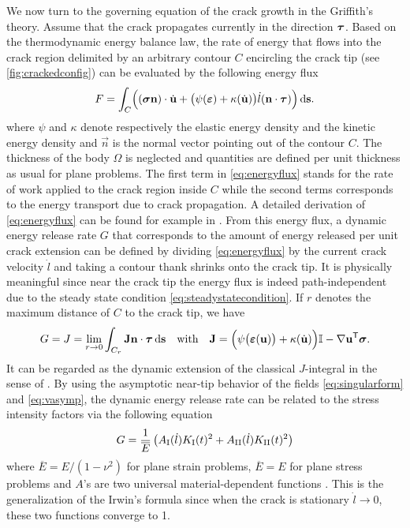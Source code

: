 We now turn to the governing equation of the crack growth in the Griffith's theory. Assume that the crack propagates currently in the direction $\vtau$. Based on the thermodynamic energy balance law, the rate of energy that flows into the crack region delimited by an arbitrary contour $C$ encircling the crack tip (see \cref{fig:crackedconfig}) can be evaluated by the following energy flux
\begin{equation} \label{eq:energyflux}
F=\int_C\Bigl((\sig\vec{n})\cdot\dot{\vec{u}}+\bigl(\psi(\eps)+\kappa(\dot{\vec{u}})\bigr)\dot{l}(\vec{n}\cdot\vtau)\Bigr)\ds.
\end{equation}
where $\psi$ and $\kappa$ denote respectively the elastic energy density and the kinetic energy density and $\vec{n}$ is the normal vector pointing out of the contour $C$. The thickness of the body $\Omega$ is neglected and quantities are defined per unit thickness as usual for plane problems. The first term in \eqref{eq:energyflux} stands for the rate of work applied to the crack region inside $C$ while the second terms corresponds to the energy transport due to crack propagation. A detailed derivation of \eqref{eq:energyflux} can be found for example in \cite{Freund:1972,NakamuraShihFreund:1985}. From this energy flux, a dynamic energy release rate $G$ that corresponds to the amount of energy released per unit crack extension can be defined by dividing \eqref{eq:energyflux} by the current crack velocity $\dot{l}$ and taking a contour thank shrinks onto the crack tip. It is physically meaningful since near the crack tip the energy flux is indeed path-independent due to the steady state condition \eqref{eq:steadystatecondition}. If $r$ denotes the maximum distance of $C$ to the crack tip, we have
\begin{equation} \label{eq:Jdyn}
G=J=\lim_{r\to 0}\int_{C_r}\vec{J}\vec{n}\cdot\vtau\ds\quad\text{with}\quad\vec{J}=\Bigl(\psi\bigl(\eps(\vec{u})\bigr)+\kappa(\dot{\vec{u}})\Bigr)\mathbb{I}-\nabla\vec{u}^\mT\sig.
\end{equation}
It can be regarded as the dynamic extension of the classical $J$-integral in the sense of \cite{Cherepanov:1967aa,Rice:1968aa}. By using the asymptotic near-tip behavior of the fields \eqref{eq:singularform} and \eqref{eq:vasymp}, the dynamic energy release rate can be related to the stress intensity factors via the following equation
\begin{equation} \label{eq:GasafunctionofK}
G=\frac{1}{\overline{E}}\left(A_\RN{1}(\dot{l})K_\RN{1}(t)^2+A_\RN{2}(\dot{l})K_\RN{2}(t)^2\right)
\end{equation}
where $\overline{E}=E/(1-\nu^2)$ for plane strain problems, $\overline{E}=E$ for plane stress problems and $A$'s are two universal material-dependent functions \cite[p.~234]{Freund:1990}. This is the generalization of the Irwin's formula \cite{Irwin:1957aa} since when the crack is stationary $\dot{l}\to 0$, these two functions converge to 1.


